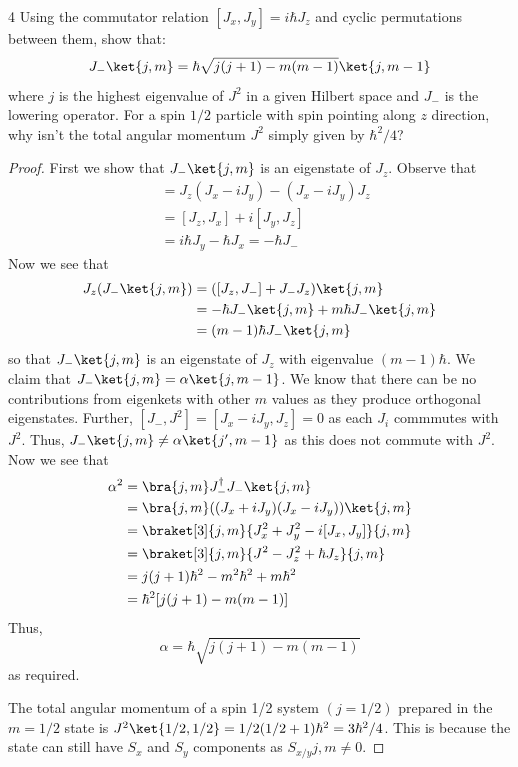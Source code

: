 \documentclass[12pt]{article}
\begin{document}
\newpage 
\begin{exc}{4}
    Using the commutator relation $[J_x, J_y] = i\hbar J_z$ and cyclic permutations between them, show that:
    \[J_-\ket{j,m} = \hbar \sqrt{j(j + 1) - m(m - 1)}\ket{j, m -1}\]
    where $j$ is the highest eigenvalue of $J^2$ in a given Hilbert space and $J_-$ is the lowering operator. For a spin $1/2$ particle with spin pointing along $z$ direction, why isn't the total angular momentum $J^2$ simply given by $\hbar^2/4$?
\end{exc}
\begin{proof}
    First we show that $J_-\ket{j, m}$ is an eigenstate of $J_z$. Observe that 
    \begin{align*}
    [J_z, J_-] &= J_z(J_x-iJ_y) - (J_x - iJ_y)J_z \\
    &= [J_z, J_x] + i[J_y, J_z] \\
    &= i\hbar J_y -\hbar J_x = -\hbar J_-
    \end{align*}
    Now we see that 
    \begin{align*}
        J_z(J_-\ket{j, m}) &= ([J_z, J_-] + J_- J_z)\ket{j, m}\\
        &= -\hbar J_- \ket{j, m} + m\hbar J_-\ket{j, m}\\
        &= (m - 1)\hbar J_-\ket{j, m}
    \end{align*}
    so that $J_-\ket{j, m}$ is an eigenstate of $J_z$ with eigenvalue $(m - 1)\hbar$. We claim that $J_-\ket{j, m} = \alpha \ket{j, m - 1}$. We know that there can be no contributions from eigenkets with other $m$ values as they produce orthogonal eigenstates. Further, $[J_-, J^2] = [J_x - iJ_y, J_z] = 0$ as each $J_i$ commmutes with $J^2$. Thus, $J_-\ket{j, m} \neq \alpha\ket{j', m - 1}$ as this does not commute with $J^2$. Now we see that 
    \begin{align*}
        \alpha^2 &= \bra{j, m}J_-^\dagger J_-\ket{j,m}\\
        &= \bra{j, m}((J_x + iJ_y)(J_x - iJ_y))\ket{j,m}\\
        &= \braket[3]{j, m}{J_x^2 + J_y^2 - i[J_x, J_y]}{j, m}\\ 
        &= \braket[3]{j, m}{J^2 - J_z^2 + \hbar J_z}{j, m}\\
        &= j(j + 1)\hbar^2 - m^2\hbar^2 + m\hbar^2\\
        &= \hbar^2 [j(j + 1)-m(m - 1)]
    \end{align*}
    Thus, 
    \[\alpha = \hbar \sqrt{j(j + 1) - m(m - 1)}\]
    as required.


    The total angular momentum of a spin 1/2 system $(j = 1/2)$ prepared in the $m = 1/2$ state is $J^2\ket{1/2, 1/2} = 1/2(1/2 + 1)\hbar^2 = 3\hbar^2/4$. This is because the state can still have $S_x$ and $S_y$ components as $S_{x/y} {j, m} \neq 0$. 
\end{proof}
\end{document}
